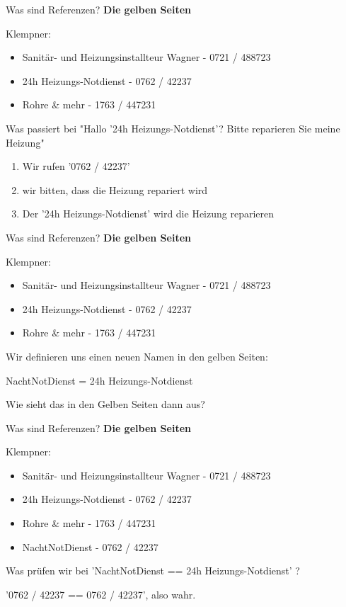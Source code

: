 \documentclass[18pt]{beamer}
\begin{document}

\begin{frame}{Was sind Referenzen?}
	\textbf{Die gelben Seiten}
	
	Klempner: 
	\begin{itemize}
		\item Sanitär- und Heizungsinstallteur Wagner - 0721 / 488723
		\item 24h Heizungs-Notdienst - 0762 / 42237
		\item Rohre \& mehr - 1763 / 447231
	\end{itemize}
	
	Was passiert bei "Hallo '24h Heizungs-Notdienst'? Bitte reparieren Sie meine Heizung"\pause
	\begin{enumerate}
		\item Wir rufen '0762 / 42237'
		\item wir bitten, dass die Heizung repariert wird
		\item Der '24h Heizungs-Notdienst' wird die Heizung reparieren
	\end{enumerate}
\end{frame}


\begin{frame}{Was sind Referenzen?}
	\textbf{Die gelben Seiten}
	
	Klempner: 
	\begin{itemize}
		\item Sanitär- und Heizungsinstallteur Wagner - 0721 / 488723
		\item 24h Heizungs-Notdienst - 0762 / 42237
		\item Rohre \& mehr - 1763 / 447231
	\end{itemize}
	
	Wir definieren uns einen neuen Namen in den gelben Seiten:
	
	NachtNotDienst = 24h Heizungs-Notdienst \pause
	
	Wie sieht das in den Gelben Seiten dann aus?
\end{frame}


\begin{frame}{Was sind Referenzen?}
	\textbf{Die gelben Seiten}
	
	Klempner: 
	\begin{itemize}
		\item Sanitär- und Heizungsinstallteur Wagner - 0721 / 488723
		\item 24h Heizungs-Notdienst - 0762 / 42237
		\item Rohre \& mehr - 1763 / 447231
		\item NachtNotDienst - 0762 / 42237
	\end{itemize} \pause
	
	Was prüfen wir bei 'NachtNotDienst == 24h Heizungs-Notdienst' ?\pause
	
	'0762 / 42237 == 0762 / 42237', also wahr.
\end{frame}
\end{document}
